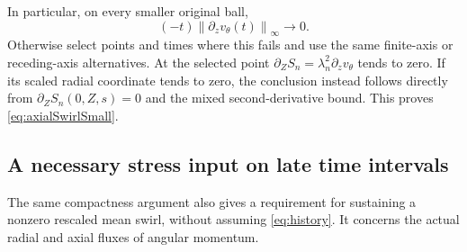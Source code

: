 \documentclass[11pt]{article}
\theoremstyle{remark}
\newcommand{\norm}[1]{\left\lVert#1\right\rVert}
\begin{document}
In particular, on every smaller original ball,
\begin{equation}\label{eq:axialSwirlSmall}
 (-t)\norm{\partial_z v_\theta(t)}_\infty\longrightarrow0.
\end{equation}
Otherwise select points and times where this fails and use the same
finite-axis or receding-axis alternatives. At the selected point
$\partial_ZS_n=\lambda_n^2\partial_zv_\theta$ tends to zero.
If its scaled radial coordinate tends to zero, the conclusion instead
follows directly from $\partial_ZS_n(0,Z,s)=0$ and the mixed
second-derivative bound. This proves \eqref{eq:axialSwirlSmall}.

\subsection{A necessary stress input on late time intervals}

The same compactness argument also gives a requirement for sustaining a
nonzero rescaled mean swirl, without assuming \eqref{eq:history}.
It concerns the actual radial and axial fluxes of angular momentum.
\end{document}
